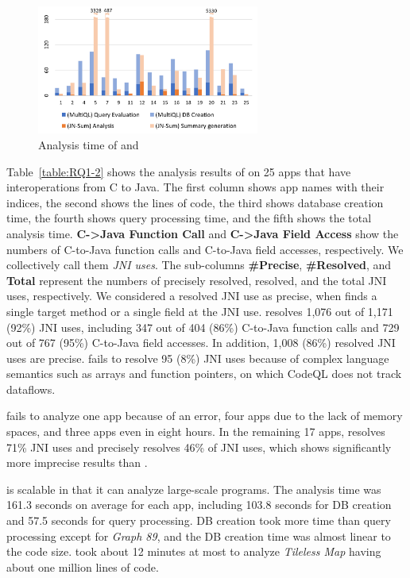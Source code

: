 \begin{figure}
  \centering
  \vspace{2mm}
  \includegraphics[width=0.65\textwidth]{img/graph}
  \vspace*{-.5em}
  \caption{Analysis time of \ours and \lees}
  \label{fig:graph}
\vspace*{-1em}
\end{figure}

Table~\ref{table:RQ1-2} shows the analysis results of \ours on 25 apps that have
interoperations from C to Java.
The first column shows app names with their indices, the second shows the lines of code,
the third shows database creation time, the
fourth shows query processing time, and the fifth shows the total analysis time.
{\bf C->Java Function Call} and {\bf C->Java Field Access} show the numbers of
C-to-Java function calls and C-to-Java field accesses, respectively. We
collectively call them \emph{JNI uses}.
The sub-columns {\bf \#Precise}, {\bf \#Resolved}, and {\bf Total} represent
the numbers of precisely resolved, resolved, and the total JNI uses,
respectively.
We considered a resolved JNI use as precise, when \ours finds a single target
method or a single field at the JNI use.
\ours resolves 1,076 out of 1,171 (92\%) JNI uses, including 347 out of 404
(86\%) C-to-Java function calls and 729 out of 767 (95\%) C-to-Java field
accesses. 
In addition, 1,008 (86\%) resolved JNI uses are precise.
\ours fails to resolve 95 (8\%) JNI uses because of complex language semantics
such as arrays and function pointers, on which
CodeQL does not track dataflows.

\lees fails to analyze one app because of an error, four apps due to the lack
of memory spaces, and three apps even in eight hours.  
In the remaining 17 apps, \lees resolves 71\% JNI uses
and precisely resolves 46\% of JNI uses,
which shows significantly more imprecise results than \ours.

\ours is scalable in that it can analyze large-scale programs. 
The analysis time was 161.3 seconds on average for each app, including 103.8
seconds for DB creation and 57.5 seconds for query processing.  
DB creation took more time than query processing except for {\it Graph 89}, and
the DB creation time was almost linear to the code size. 
\ours took about 12 minutes at most to analyze {\it Tileless Map} having about
one million lines of code.

